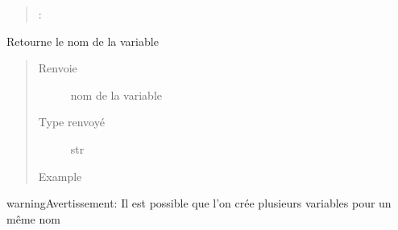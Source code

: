 \documentclass[letterpaper,10pt,french]{sphinxmanual}
\begin{document}
\begin{fulllineitems}
\begin{fulllineitems}
\begin{quote}
\begin{description}
\begin{sphinxVerbatim}[commandchars=\\\{\}]
: 
\end{sphinxVerbatim}

\end{description}\end{quote}

\end{fulllineitems}


\begin{fulllineitems}
\label{\detokenize{variable:variable.Variable.name}}
Retourne le nom de la variable
\begin{quote}\begin{description}
\item[{Renvoie}] \leavevmode
nom de la variable

\item[{Type renvoyé}] \leavevmode
str

\item[{Example}] \leavevmode
\begin{sphinxVerbatim}[commandchars=\\\{\}]
\end{sphinxVerbatim}

\end{description}\end{quote}

\begin{sphinxadmonition}{warning}{Avertissement:}
Il est possible que l’on crée plusieurs variables pour un même nom
\end{sphinxadmonition}

\end{fulllineitems}


\end{fulllineitems}
\end{document}

